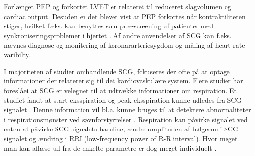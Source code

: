 Forlænget PEP og forkortet LVET er relateret til reduceret slagvolumen og cardiac output. Desuden er det blevet vist at PEP forkortes når kontraktiliteten stiger, hvilket f.eks. kan benyttes som præ-screening af patienter med synkroniseringsproblemer i hjertet  \cite{zanetti}  \cite{abra}. Af andre anvendelser af SCG kan f.eks. nævnes diagnose og monitering af koronararteriesygdom og måling af heart rate varibilty.

I majoriteten af studier omhandlende SCG, fokuseres der ofte på at optage informationer der relaterer sig til det kardiovaskulære system. Flere studier har foreslået at SCG er velegnet til at udtrække informationer om respiration. Et studiet fandt at start-eksspiration og peak-eksspiration kunne udledes fra SCG signalet \cite{pandia} \cite{magic}. Denne information vil  bl.a. kunne bruges til at detektere abnormaliteter i respirationsmønster ved søvnforstyrrelser \cite{tavaloka}. Respiration kan påvirke signalet ved enten at påvirke SCG signalets baseline, ændre amplituden af bølgerne i SCG-signalet og ændring i RRI (low-frequency power of R-R interval). Hvor meget man kan aflæse ud fra de enkelte parametre er dog meget individuelt \cite{magic}.